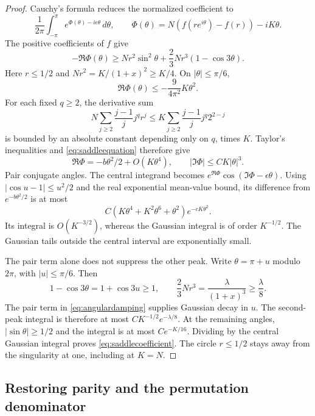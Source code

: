 \documentclass[11pt]{article}
\theoremstyle{definition}
\theoremstyle{remark}
\newcommand{\1}{\mathbf 1}
\begin{document}
\begin{proof}
Cauchy's formula reduces the normalized coefficient to
\[
\frac1{2\pi}\int_{-\pi}^{\pi}
e^{\Phi(\theta)-i\epsilon\theta}\,d\theta,
\qquad
\Phi(\theta)=N(f(re^{i\theta})-f(r))-iK\theta.
\]
The positive coefficients of $f$ give
\begin{equation}\label{eq:angulardamping}
-\Re\Phi(\theta)
\ge Nr^2\sin^2\theta+\frac23Nr^3(1-\cos3\theta).
\end{equation}
Here $r\le1/2$ and $Nr^2=K/(1+x)^2\ge K/4$. On $|\theta|\le\pi/6$,
\[
\Re\Phi(\theta)\le-\frac9{4\pi^2}K\theta^2.
\]
For each fixed $q\ge2$, the derivative sum
\[
N\sum_{j\ge2}\frac{j-1}{j}j^qr^j
\le K\sum_{j\ge2}\frac{j-1}{j}j^q2^{2-j}
\]
is bounded by an absolute constant depending only on $q$, times $K$. Taylor's inequalities and \eqref{eq:saddleequation} therefore give
\[
\Re\Phi=-b\theta^2/2+O(K\theta^4),\qquad
|\Im\Phi|\le CK|\theta|^3.
\]
Pair conjugate angles. The central integrand becomes
$e^{\Re\Phi}\cos(\Im\Phi-\epsilon\theta)$. Using
$|\cos u-1|\le u^2/2$ and the real exponential mean-value bound, its difference from $e^{-b\theta^2/2}$ is at most
\[
C(K\theta^4+K^2\theta^6+\theta^2)e^{-cK\theta^2}.
\]
Its integral is $O(K^{-3/2})$, whereas the Gaussian integral is of order $K^{-1/2}$. The Gaussian tails outside the central interval are exponentially small.

The pair term alone does not suppress the other peak. Write $\theta=\pi+u$ modulo $2\pi$, with $|u|\le\pi/6$. Then
\[
1-\cos3\theta=1+\cos3u\ge1,\qquad
\frac23Nr^3=\frac\lambda{(1+x)^3}\ge\frac\lambda8.
\]
The pair term in \eqref{eq:angulardamping} supplies Gaussian decay in $u$. The second-peak integral is therefore at most $CK^{-1/2}e^{-\lambda/8}$. At the remaining angles, $|\sin\theta|\ge1/2$ and the integral is at most $Ce^{-K/16}$. Dividing by the central Gaussian integral proves \eqref{eq:saddlecoefficient}. The circle $r\le1/2$ stays away from the singularity at one, including at $K=N$.
\end{proof}

\subsection{Restoring parity and the permutation denominator}
\end{document}
